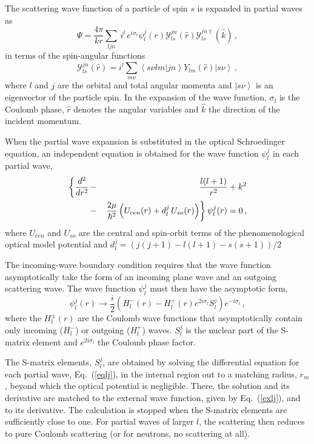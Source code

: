 The scattering wave function of a particle of spin $s$ is expanded in
partial waves as
\begin{equation}
\Psi=%
\frac{4\pi}{kr}\sum_{ljn}\, i^{l}\, e^{i\sigma_{l}}\psi_{l}^{j}(r){\mathcal{Y%
}}_{ls}^{jn}(\hat{r}){\mathcal{Y}}_{ls}^{jn\dagger}(\hat{k})\,,
\label{parwav}
\end{equation}
in terms of the spin-angular functions
\begin{equation}
{\mathcal{Y}}_{ls}^{jn}(\hat{r})=i^{l}\sum_{m\nu}\left\langle s\nu
lm|jn\right\rangle Y_{lm}(\hat{r})\left|s\nu\right\rangle \,,
\end{equation}
where $l$ and $j$ are the orbital and total angular momenta and $%
\left|s\nu\right\rangle $ is an eigenvector of the particle spin. In the
expansion of the wave function, $\sigma_{l}$ is the Coulomb phase, $\hat{r}$
denotes the angular variables and $\hat{k}$ the direction of the incident
momentum.

When the partial wave expansion is substituted in the optical Schroedinger
equation, an independent equation is obtained for the wave function $%
\psi_{l}^{j}$ in each partial wave,
\begin{eqnarray}
\left\{ \frac{d^{2}}{dr^{2}}\right. & - & \frac{l(l+1)}{r^{2}}+k^{2}
\label{eqlj} \\
& - & \left.\frac{2\mu}{\hbar^{2}}\left(U_{cen}(r)+d_{l}^{j}\,
U_{so}(r)\right)\right\} \psi_{l}^{j}(r)=0\,,  \notag
\end{eqnarray}
where $U_{cen}$ and $U_{so}$ are the central and spin-orbit terms of the
phenomenological optical model potential and $%
d_{l}^{j}=(j(j+1)-l(l+1)-s(s+1))/2$

The incoming-wave boundary condition requires that the wave function
asymptotically take the form of an incoming plane wave and an outgoing
scattering wave. The wave function $\psi_{l}^{j}$ must then have the
asymptotic form,
\begin{equation}
\psi_{l}^{j}(r)\rightarrow\frac{i}{2}\left(H_{l}^{-}(r)-H_{l}^{+}(r)e^{2i%
\sigma_{l}}S_{l}^{j}\right)e^{-i\sigma_{l}}\,,  \label{exlj}
\end{equation}
where the $H_{l}^{\pm}(r)$ are the Coulomb wave functions that
asymptotically contain only incoming ($H_{l}^{-}$) or outgoing ($H_{l}^{+}$)
waves. $S_{l}^{j}$ is the nuclear part of the S-matrix element and $%
e^{2i\sigma_{l}}$ the Coulomb phase factor.

The S-matrix elements, $S_{l}^{j}$, are obtained by solving the differential
equation for each partial wave, Eq.~(\ref{eqlj}), in the internal region out
to a matching radius, $r_{m}$, beyond which the optical potential is
negligible. There, the solution and its derivative are matched to the
external wave function, given by Eq.~(\ref{exlj}), and to its derivative.
The calculation is stopped when the S-matrix elements are sufficiently close
to one. For partial waves of larger $l$, the scattering then reduces to pure
Coulomb scattering (or for neutrons, no scattering at all).

